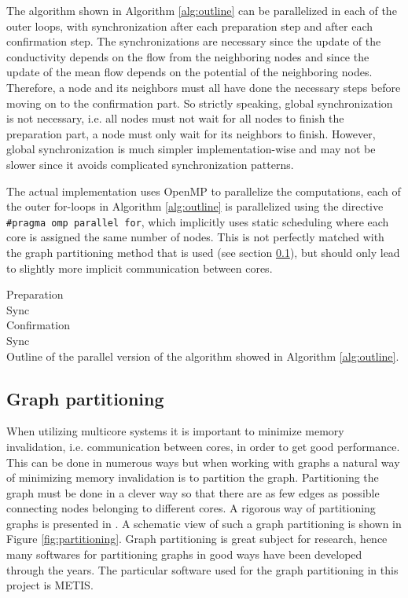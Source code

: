 The algorithm shown in Algorithm \ref{alg:outline} can be parallelized in each of the outer loops, with synchronization after each preparation step and after each confirmation step. The synchronizations are necessary since the update of the conductivity depends on the flow from the neighboring nodes and since the update of the mean flow depends on the potential of the neighboring nodes. Therefore, a node and its neighbors must all have done the necessary steps before moving on to the confirmation part. So strictly speaking, global synchronization is not necessary, i.e. all nodes must not wait for all nodes to finish the preparation part, a node must only wait for its neighbors to finish. However, global synchronization is much simpler implementation-wise and may not be slower since it avoids complicated synchronization patterns.

The actual implementation uses OpenMP to parallelize the computations, each of the outer for-loops in Algorithm \ref{alg:outline} is parallelized using the directive \texttt{\#pragma omp parallel for}, which implicitly uses static scheduling where each core is assigned the same number of nodes. This is not perfectly matched with the graph partitioning method that is used (see section \ref{sec:graph_part}), but should only lead to slightly more implicit communication between cores.

{
\vspace{1em}
\begin{algorithm}[H]
Preparation\\
Sync\\
Confirmation\\
Sync\\
\caption{Outline of the parallel version of the algorithm showed in Algorithm \ref{alg:outline}.}
\label{alg:parallel}
\end{algorithm}
\vspace{1em}
}

\subsection{Graph partitioning}
\label{sec:graph_part}
When utilizing multicore systems it is important to minimize memory invalidation, i.e. communication between cores, in order to get good performance. This can be done in numerous ways but when working with graphs a natural way of minimizing memory invalidation is to partition the graph. Partitioning the graph must be done in a clever way so that there are as few edges as possible connecting nodes belonging to different cores. A rigorous way of partitioning graphs is presented in \cite{Lasalle}. A schematic view of such a graph partitioning is shown in Figure \ref{fig:partitioning}. Graph partitioning is great subject for research, hence many softwares for partitioning graphs in good ways have been developed through the years. The particular software used for the graph partitioning in this project is METIS. 

